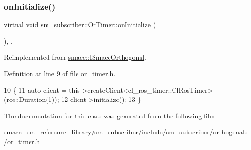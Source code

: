 \subsubsection{\texorpdfstring{on\+Initialize()}{onInitialize()}}
{\footnotesize\ttfamily virtual void sm\+\_\+subscriber\+::\+Or\+Timer\+::on\+Initialize (\begin{DoxyParamCaption}{ }\end{DoxyParamCaption})\hspace{0.3cm}{\ttfamily [inline]}, {\ttfamily [override]}, {\ttfamily [virtual]}}



Reimplemented from \hyperlink{classsmacc_1_1ISmaccOrthogonal_a6bb31c620cb64dd7b8417f8705c79c7a}{smacc\+::\+I\+Smacc\+Orthogonal}.



Definition at line 9 of file or\+\_\+timer.\+h.


\begin{DoxyCode}
10     \{
11         \textcolor{keyword}{auto} client = this->createClient<cl\_ros\_timer::ClRosTimer>(ros::Duration(1));
12         client->initialize();
13     \}
\end{DoxyCode}


The documentation for this class was generated from the following file\+:\begin{DoxyCompactItemize}
\item 
smacc\+\_\+sm\+\_\+reference\+\_\+library/sm\+\_\+subscriber/include/sm\+\_\+subscriber/orthogonals/\hyperlink{sm__subscriber_2include_2sm__subscriber_2orthogonals_2or__timer_8h}{or\+\_\+timer.\+h}\end{DoxyCompactItemize}
